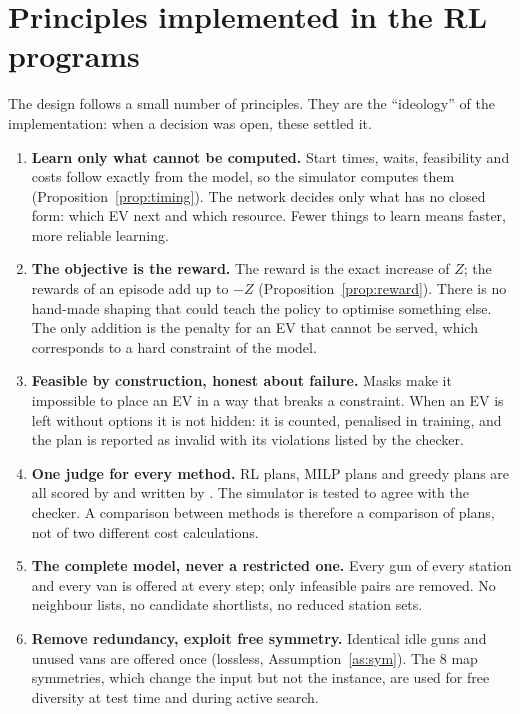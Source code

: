 \section{Principles implemented in the RL programs}
\label{sec:principles}

The design follows a small number of principles. They are the ``ideology'' of the implementation: when a decision was open, these settled it.

\begin{enumerate}[leftmargin=*,label=\textbf{P\arabic*.}]
  \item \textbf{Learn only what cannot be computed.} Start times, waits, feasibility and costs follow exactly from the model, so the simulator computes them (Proposition~\ref{prop:timing}). The network decides only what has no closed form: which EV next and which resource. Fewer things to learn means faster, more reliable learning.

  \item \textbf{The objective is the reward.} The reward is the exact increase of $Z$; the rewards of an episode add up to $-Z$ (Proposition~\ref{prop:reward}). There is no hand-made shaping that could teach the policy to optimise something else. The only addition is the penalty for an EV that cannot be served, which corresponds to a hard constraint of the model.

  \item \textbf{Feasible by construction, honest about failure.} Masks make it impossible to place an EV in a way that breaks a constraint. When an EV is left without options it is not hidden: it is counted, penalised in training, and the plan is reported as invalid with its violations listed by the checker.

  \item \textbf{One judge for every method.} RL plans, MILP plans and greedy plans are all scored by  and written by . The simulator is tested to agree with the checker. A comparison between methods is therefore a comparison of plans, not of two different cost calculations.

  \item \textbf{The complete model, never a restricted one.} Every gun of every station and every van is offered at every step; only infeasible pairs are removed. No neighbour lists, no candidate shortlists, no reduced station sets.

  \item \textbf{Remove redundancy, exploit free symmetry.} Identical idle guns and unused vans are offered once (lossless, Assumption~\ref{as:sym}). The 8 map symmetries, which change the input but not the instance, are used for free diversity at test time and during active search.


\end{enumerate}
